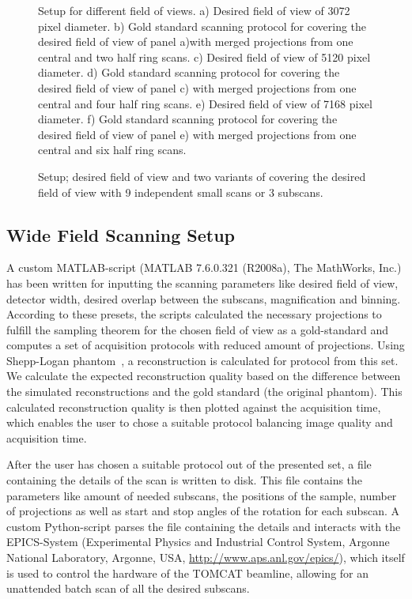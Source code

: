 \ifiucr
	\begin{figure}%
		\centering%
		\caption{Setup for different field of views. %
		a) Desired field of view of 3072 pixel diameter. %
		b) Gold standard scanning protocol for covering the desired field of view of panel a)with merged projections from one central and two half ring scans. %
		c) Desired field of view of 5120 pixel diameter. %
		d) Gold standard scanning protocol for covering the desired field of view of panel c) with merged projections from one central and four half ring scans. %
		e) Desired field of view of 7168 pixel diameter. %
		f) Gold standard scanning protocol for covering the desired field of view of panel e) with merged projections from one central and six half ring scans. %
		}%
		
		\label{fig:SubScan-Setup}%
	\end{figure}%
\else
	\begin{figure*}[htp]
		\centering%
		
		\caption{Setup; desired field of view and two variants of covering the desired field of view with 9 independent small scans or 3 subscans.}%
		\label{fig:SubScan-Setup}%
	\end{figure*}
\fi

\subsection{Wide Field Scanning Setup}%
\label{subsec:wfs-setup}%
A custom MATLAB-script (MATLAB\textsuperscript{\textregistered} 7.6.0.321 (R2008a), The MathWorks, Inc.) has been written for inputting the scanning parameters like desired field of view, detector width, desired overlap between the subscans, magnification and binning. According to these presets, the scripts calculated the necessary projections to fulfill the sampling theorem for the chosen field of view as a gold-standard and computes a set of acquisition protocols with reduced amount of projections. Using Shepp-Logan phantom~\cite{Shepp1974}, a reconstruction is calculated for protocol from this set. We calculate the expected reconstruction quality based on the difference between the simulated reconstructions and the gold standard (the original phantom). This calculated reconstruction quality is then plotted against the acquisition time, which enables the user to chose a suitable protocol balancing image quality and acquisition time.

After the user has chosen a suitable protocol out of the presented set, a file containing the details of the scan is written to disk. This file contains the parameters like amount of needed subscans, the positions of the sample, number of projections as well as start and stop angles of the rotation for each subscan. A custom Python-script parses the file containing the details and interacts with the EPICS-System (Experimental Physics and Industrial Control System, Argonne National Laboratory, Argonne, USA, \url{http://www.aps.anl.gov/epics/}), which itself is used to control the hardware of the TOMCAT beamline, allowing for an unattended batch scan of all the desired subscans.

